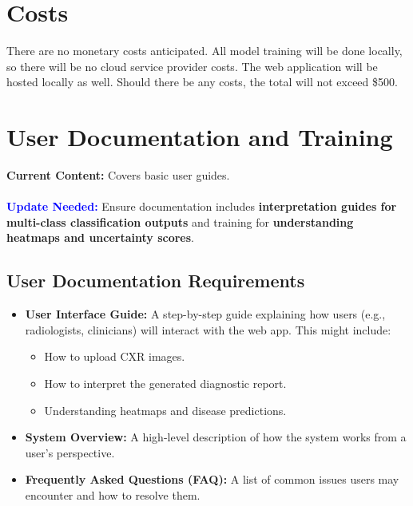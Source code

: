 \documentclass[12pt]{article}
\begin{document}
\section{Costs}
There are no monetary costs anticipated. All model training will be done locally, so there will be 
no cloud service provider costs. The web application will be hosted locally as well. Should there 
be any costs, the total will not exceed \$500.

\section{User Documentation and Training}

\textbf{Current Content:} Covers basic user guides. \\
\\
\textbf{\textcolor{blue}{Update Needed:}} Ensure documentation includes \textbf{interpretation guides for multi-class classification outputs} and training for \textbf{understanding heatmaps and uncertainty scores}.

\subsection{User Documentation Requirements}
\begin{itemize}
    \item \textbf{User Interface Guide:} A step-by-step guide explaining how users (e.g., 
    radiologists, clinicians) will interact with the web app. This might include:
    \begin{itemize}
        \item How to upload CXR images.
        \item How to interpret the generated diagnostic report.
        \item Understanding heatmaps and disease predictions.
    \end{itemize}
    \item \textbf{System Overview:} A high-level description of how the system works from a user’s 
    perspective.
    \item \textbf{Frequently Asked Questions (FAQ):} A list of common issues users may encounter 
    and how to resolve them.
\end{itemize}
\end{document}
